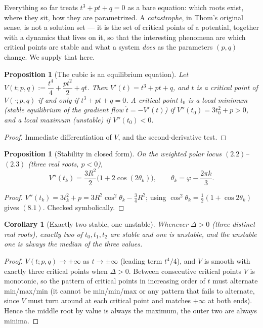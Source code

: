 \documentclass[11pt]{amsart}
\newtheorem{proposition}[theorem]{Proposition}
\newtheorem{corollary}[theorem]{Corollary}
\theoremstyle{remark}
\begin{document}
Everything so far treats $t^3+pt+q=0$ as a bare equation: which roots exist, where they sit, how they are parametrized. A \emph{catastrophe}, in Thom's original sense, is not a solution set --- it is the set of critical points of a potential, together with a dynamics that lives on it, so that the interesting phenomena are which critical points are stable and what a system \emph{does} as the parameters $(p,q)$ change. We supply that here.

\begin{proposition}[The cubic is an equilibrium equation]\label{prop:potential}
Let $V(t;p,q):=\dfrac{t^4}4+\dfrac{pt^2}2+qt$. Then $V'(t)=t^3+pt+q$, and $t$ is a critical point of $V(\cdot;p,q)$ if and only if $t^3+pt+q=0$. A critical point $t_0$ is a local minimum (stable equilibrium of the gradient flow $\dot t=-V'(t)$) if $V''(t_0)=3t_0^2+p>0$, and a local maximum (unstable) if $V''(t_0)<0$.
\end{proposition}

\begin{proof}
Immediate differentiation of $V$, and the second-derivative test.
\end{proof}

\begin{proposition}[Stability in closed form]\label{prop:stability}
On the weighted polar locus $(2.2)$--$(2.3)$ (three real roots, $p<0$),
\begin{equation}
V''(t_k)=\frac{3R^2}2\bigl(1+2\cos(2\theta_k)\bigr),\qquad\theta_k=\varphi-\frac{2\pi k}3. \tag{8.1}
\end{equation}
\end{proposition}

\begin{proof}
$V''(t_k)=3t_k^2+p=3R^2\cos^2\theta_k-\tfrac34R^2$; using $\cos^2\theta_k=\tfrac12(1+\cos2\theta_k)$ gives $(8.1)$. Checked symbolically.
\end{proof}

\begin{corollary}[Exactly two stable, one unstable]\label{cor:minmaxmin}
Whenever $\Delta>0$ (three distinct real roots), exactly two of $t_0,t_1,t_2$ are stable and one is unstable, and the unstable one is always the median of the three values.
\end{corollary}

\begin{proof}
$V(t;p,q)\to+\infty$ as $t\to\pm\infty$ (leading term $t^4/4$), and $V$ is smooth with exactly three critical points when $\Delta>0$. Between consecutive critical points $V$ is monotonic, so the pattern of critical points in increasing order of $t$ must alternate min/max/min (it cannot be min/min/max or any pattern that fails to alternate, since $V$ must turn around at each critical point and matches $+\infty$ at both ends). Hence the middle root by value is always the maximum, the outer two are always minima.
\end{proof}
\end{document}
